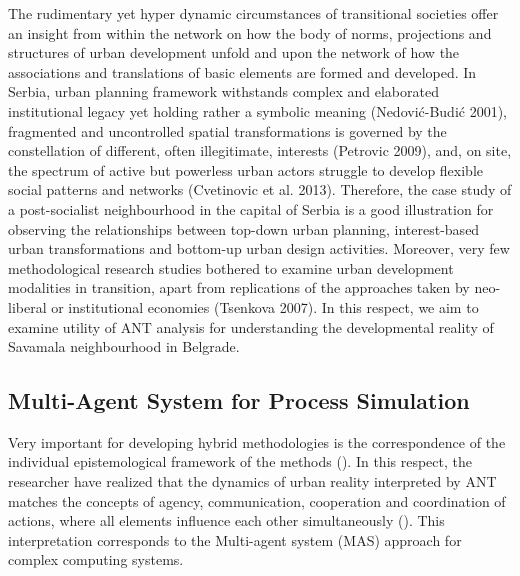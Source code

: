 \documentclass[11pt]{report}
\begin{document}
The rudimentary yet hyper dynamic circumstances of transitional societies offer an insight from within the network on how the body of norms, projections and structures of urban development unfold and upon the network of how the associations and translations of basic elements are formed and developed. In Serbia, urban planning framework withstands complex and elaborated institutional legacy yet holding rather a symbolic meaning (Nedović-Budić 2001), fragmented and uncontrolled spatial transformations is governed by the constellation of different, often illegitimate, interests (Petrovic 2009), and, on site, the spectrum of active but powerless urban actors struggle to develop flexible social patterns and networks (Cvetinovic et al. 2013). Therefore, the case study of a post-socialist neighbourhood in the capital of Serbia is a good illustration for observing the relationships between top-down urban planning, interest-based urban transformations and bottom-up urban design activities. Moreover, very few methodological research studies bothered to examine urban  development modalities  in  transition,  apart  from  replications  of  the  approaches  taken  by  neo-liberal  or institutional economies (Tsenkova 2007). In this respect, we aim to examine utility of ANT analysis for understanding the developmental reality of Savamala neighbourhood in Belgrade.

\subsection{Multi-Agent System for Process Simulation}

Very important for developing hybrid methodologies is the correspondence of the individual epistemological framework of the methods (\cite{mixed method}). In this respect, the researcher have realized that the dynamics of urban reality interpreted by ANT matches the concepts of agency, communication, cooperation and coordination of actions, where all elements influence each other simultaneously (\cite{(Ferber 1999)}).
This interpretation corresponds to the Multi-agent system (MAS) approach for complex computing systems.
\\
\end{document}
